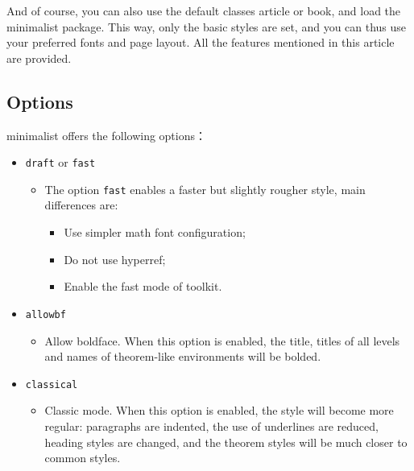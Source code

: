 \documentclass{minimart}
\providecommand{\minimalist}{\textsf{minimalist}}
\begin{document}

And of course, you can also use the default classes \textsf{article} or \textsf{book}, and load the \minimalist{} package. This way, only the basic styles are set, and you can thus use your preferred fonts and page layout. All the features mentioned in this article are provided.

\begin{code}
  \usepackage{minimalist}
\end{code}

\subsection{Options}

\minimalist{} offers the following options：

\begin{itemize}
    \item \texttt{draft} or \texttt{fast}
        \begin{itemize}
            \item The option \verb|fast| enables a faster but slightly rougher style, main differences are:
            \begin{itemize}
                \item Use simpler math font configuration; 
                \item Do not use hyperref; 
                \item Enable the fast mode of \ProjLib{} toolkit.
            \end{itemize}
        \end{itemize}
    \item \texttt{allowbf}
        \begin{itemize}
            \item Allow boldface. When this option is enabled, the title, titles of all levels and names of theorem-like environments will be bolded.
        \end{itemize}
    \item \texttt{classical}
        \begin{itemize}
            \item Classic mode. When this option is enabled, the style will become more regular: paragraphs are indented, the use of underlines are reduced, heading styles are changed, and the theorem styles will be much closer to common styles.
        \end{itemize}
\end{itemize}
\end{document}
